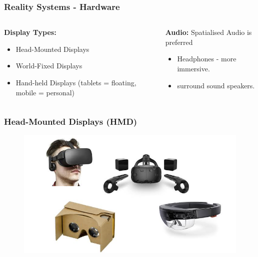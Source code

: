 \begin{frame}
	\frametitle{Reality Systems - Hardware}
	
	\begin{columns}
		
		\begin{column}{0.5\textwidth}
			\textbf{Display Types:}
			\begin{itemize}
				\item Head-Mounted Displays
				\item World-Fixed Displays
				\item Hand-held Displays (tablets = floating, mobile = personal)
			\end{itemize}
		\end{column}
		
		\begin{column}{0.5\textwidth}

			\textbf{Audio:}
			Spatialised Audio is preferred
			\begin{itemize}
				\item Headphones - more immersive.
				\item surround sound speakers.
			\end{itemize}
			
		\end{column}
		
	\end{columns}
\end{frame}

\begin{frame}
	\frametitle{Head-Mounted Displays (HMD)}
	\begin{figure}
		\includegraphics[scale=0.4]{assets/hmd.png}
	\end{figure}
\end{frame}


